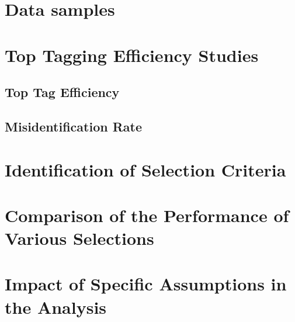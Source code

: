 \section{Data samples}
\label{sec:stop_samples}

\section{Top Tagging Efficiency Studies}
\label{sec:stop_toptagging}

\subsection{Top Tag Efficiency}
\label{subsec:stop_top_tag}

\subsection{Misidentification Rate}
\label{subsec:stop_misid}

\section{Identification of Selection Criteria}
\label{sec:stop_cuts}

\section{Comparison of the Performance of Various Selections}
\label{sec:stop_limit_comp}

\section{Impact of Specific Assumptions in the Analysis }
\label{sec:stop_discussion}
